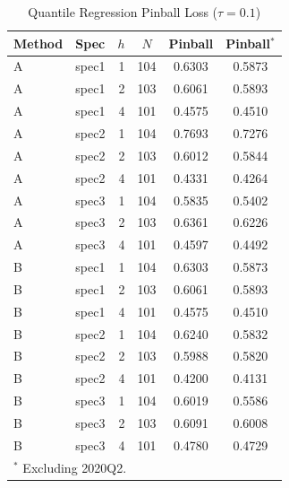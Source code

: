 \begin{table}[htbp]
\centering
\caption{Quantile Regression Pinball Loss ($\tau = 0.1$)}
\label{tab:qr_pinball}
\footnotesize
\begin{tabular}{llrccc}
\toprule
Method & Spec & $h$ & $N$ & Pinball & Pinball$^*$ \\
\midrule
  A & spec1 & 1 & 104 & 0.6303 & 0.5873 \\
  A & spec1 & 2 & 103 & 0.6061 & 0.5893 \\
  A & spec1 & 4 & 101 & 0.4575 & 0.4510 \\
  A & spec2 & 1 & 104 & 0.7693 & 0.7276 \\
  A & spec2 & 2 & 103 & 0.6012 & 0.5844 \\
  A & spec2 & 4 & 101 & 0.4331 & 0.4264 \\
  A & spec3 & 1 & 104 & 0.5835 & 0.5402 \\
  A & spec3 & 2 & 103 & 0.6361 & 0.6226 \\
  A & spec3 & 4 & 101 & 0.4597 & 0.4492 \\
  B & spec1 & 1 & 104 & 0.6303 & 0.5873 \\
  B & spec1 & 2 & 103 & 0.6061 & 0.5893 \\
  B & spec1 & 4 & 101 & 0.4575 & 0.4510 \\
  B & spec2 & 1 & 104 & 0.6240 & 0.5832 \\
  B & spec2 & 2 & 103 & 0.5988 & 0.5820 \\
  B & spec2 & 4 & 101 & 0.4200 & 0.4131 \\
  B & spec3 & 1 & 104 & 0.6019 & 0.5586 \\
  B & spec3 & 2 & 103 & 0.6091 & 0.6008 \\
  B & spec3 & 4 & 101 & 0.4780 & 0.4729 \\
\bottomrule
\multicolumn{6}{l}{\footnotesize $^*$ Excluding 2020Q2.} \\
\end{tabular}
\end{table}